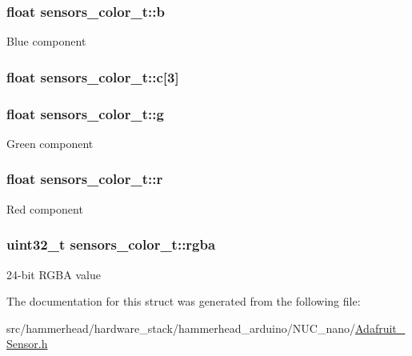 \subsubsection[{\texorpdfstring{b}{b}}]{\setlength{\rightskip}{0pt plus 5cm}float sensors\+\_\+color\+\_\+t\+::b}\hypertarget{structsensors__color__t_a1bf461b5c728e323f8883a3785c7c60b}{}\label{structsensors__color__t_a1bf461b5c728e323f8883a3785c7c60b}
Blue component 
\subsubsection[{\texorpdfstring{c}{c}}]{\setlength{\rightskip}{0pt plus 5cm}float sensors\+\_\+color\+\_\+t\+::c\mbox{[}3\mbox{]}}\hypertarget{structsensors__color__t_a4d76803c2e83303f611cf2a7910eaf17}{}\label{structsensors__color__t_a4d76803c2e83303f611cf2a7910eaf17}
\subsubsection[{\texorpdfstring{g}{g}}]{\setlength{\rightskip}{0pt plus 5cm}float sensors\+\_\+color\+\_\+t\+::g}\hypertarget{structsensors__color__t_ac91ecea980718cf134f60c497d2a0049}{}\label{structsensors__color__t_ac91ecea980718cf134f60c497d2a0049}
Green component 
\subsubsection[{\texorpdfstring{r}{r}}]{\setlength{\rightskip}{0pt plus 5cm}float sensors\+\_\+color\+\_\+t\+::r}\hypertarget{structsensors__color__t_acdeed981e7df8c701e09d4b2fdb9a40c}{}\label{structsensors__color__t_acdeed981e7df8c701e09d4b2fdb9a40c}
Red component 
\subsubsection[{\texorpdfstring{rgba}{rgba}}]{\setlength{\rightskip}{0pt plus 5cm}uint32\+\_\+t sensors\+\_\+color\+\_\+t\+::rgba}\hypertarget{structsensors__color__t_a0afbff980c17fbacdab1666735f3d3e6}{}\label{structsensors__color__t_a0afbff980c17fbacdab1666735f3d3e6}
24-\/bit R\+G\+BA value 

The documentation for this struct was generated from the following file\+:\begin{DoxyCompactItemize}
\item 
src/hammerhead/hardware\+\_\+stack/hammerhead\+\_\+arduino/\+N\+U\+C\+\_\+nano/\hyperlink{Adafruit__Sensor_8h}{Adafruit\+\_\+\+Sensor.\+h}\end{DoxyCompactItemize}
